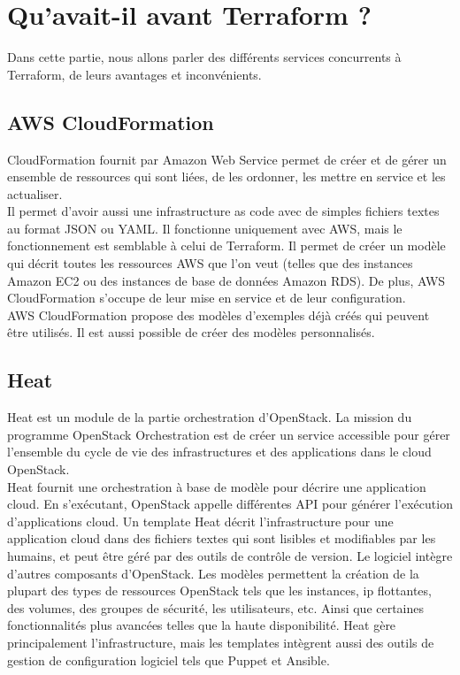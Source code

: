 \documentclass[]{article}
\begin{document}
\section{Qu'avait-il avant Terraform ?}\label{avant-terraform}
Dans cette partie, nous allons parler des différents services concurrents à Terraform, de leurs avantages et inconvénients.
\subsection{AWS CloudFormation}\label{aws-cloudformation}
CloudFormation fournit par Amazon Web Service permet de créer et de
gérer un ensemble de ressources qui sont liées, de les ordonner, les
mettre en service et les actualiser. \\
Il permet d'avoir aussi une infrastructure as code avec de simples fichiers textes au
format JSON ou YAML. Il fonctionne uniquement avec AWS, mais le
fonctionnement est semblable à celui de  Terraform. Il permet de créer un modèle qui
décrit toutes les ressources AWS que l'on veut (telles que des instances
Amazon EC2 ou des instances de base de données Amazon RDS). De plus, AWS
CloudFormation s'occupe de leur mise en service et de leur
configuration.\\
AWS CloudFormation propose des modèles d'exemples déjà
créés qui peuvent être utilisés. Il est aussi possible de créer des
modèles personnalisés.
\subsection{Heat}\label{heat}
Heat est un module de la partie orchestration d'OpenStack. La mission du
programme OpenStack Orchestration est de créer un service accessible
pour gérer l'ensemble du cycle de vie des infrastructures et des
applications dans le cloud OpenStack. \\
Heat fournit une orchestration à
base de modèle pour décrire une application cloud. En s'exécutant,
OpenStack appelle différentes API pour générer l'exécution d'applications
cloud. Un template Heat décrit l'infrastructure pour une application
cloud dans des fichiers textes qui sont lisibles et modifiables par les
humains, et peut être géré par des outils de contrôle de version. Le
logiciel intègre d'autres composants d'OpenStack. Les modèles permettent
la création de la plupart des types de ressources OpenStack tels que les
instances, ip flottantes, des volumes, des groupes de sécurité, les
utilisateurs, etc. Ainsi que certaines fonctionnalités plus avancées
telles que la haute disponibilité. Heat gère principalement
l'infrastructure, mais les templates intègrent aussi des outils de
gestion de configuration logiciel tels que Puppet et Ansible.
\end{document}
